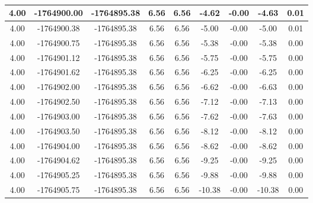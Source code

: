 \begin{table}[htbp]
\begin{adjustbox}{angle=90}
\begin{tabular}{|c|c|c|c|c|c|c|c|c|}
 4.00 & -1764900.00 & -1764895.38 & 6.56 & 6.56 & -4.62 & -0.00 & -4.63 & 0.01\\ \hline
 4.00 & -1764900.38 & -1764895.38 & 6.56 & 6.56 & -5.00 & -0.00 & -5.00 & 0.01\\ \hline
 4.00 & -1764900.75 & -1764895.38 & 6.56 & 6.56 & -5.38 & -0.00 & -5.38 & 0.00\\ \hline
 4.00 & -1764901.12 & -1764895.38 & 6.56 & 6.56 & -5.75 & -0.00 & -5.75 & 0.00\\ \hline
 4.00 & -1764901.62 & -1764895.38 & 6.56 & 6.56 & -6.25 & -0.00 & -6.25 & 0.00\\ \hline
 4.00 & -1764902.00 & -1764895.38 & 6.56 & 6.56 & -6.62 & -0.00 & -6.63 & 0.00\\ \hline
 4.00 & -1764902.50 & -1764895.38 & 6.56 & 6.56 & -7.12 & -0.00 & -7.13 & 0.00\\ \hline
 4.00 & -1764903.00 & -1764895.38 & 6.56 & 6.56 & -7.62 & -0.00 & -7.63 & 0.00\\ \hline
 4.00 & -1764903.50 & -1764895.38 & 6.56 & 6.56 & -8.12 & -0.00 & -8.12 & 0.00\\ \hline
 4.00 & -1764904.00 & -1764895.38 & 6.56 & 6.56 & -8.62 & -0.00 & -8.62 & 0.00\\ \hline
 4.00 & -1764904.62 & -1764895.38 & 6.56 & 6.56 & -9.25 & -0.00 & -9.25 & 0.00\\ \hline
 4.00 & -1764905.25 & -1764895.38 & 6.56 & 6.56 & -9.88 & -0.00 & -9.88 & 0.00\\ \hline
 4.00 & -1764905.75 & -1764895.38 & 6.56 & 6.56 & -10.38 & -0.00 & -10.38 & 0.00\\ \hline
            \end{tabular}
        \end{adjustbox}
        \caption{}
        \label{}
    \end{table}
    